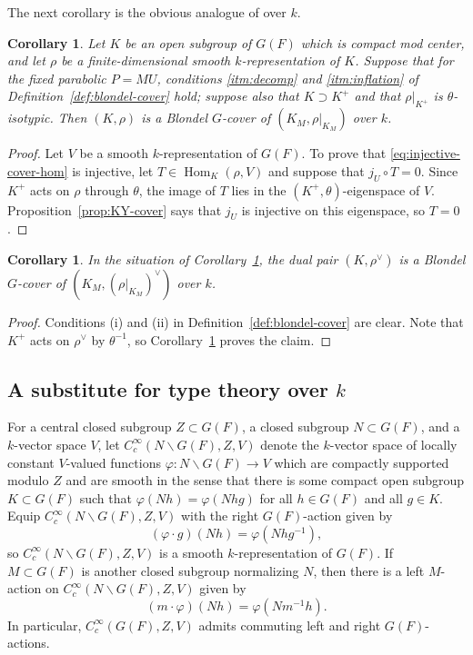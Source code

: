 \documentclass[reqno]{amsart}
\numberwithin{equation}{subsection}
\newcommand{\co}{\colon}
\DeclareMathOperator{\Hom}{Hom}
\newtheorem{cor}[thm]{Corollary}
\theoremstyle{remark}
\numberwithin{equation}{subsection}
\numberwithin{figure}{subsection}
\begin{document}
The next corollary is the obvious analogue of \cite[Corollary 6.4]{KY17} over $k$. 

\begin{cor}\label{cor:KY-64}
Let $K$ be an open subgroup of $G(F)$ which is compact mod center, and let $\rho$ be a finite-dimensional smooth $k$-representation of $K$. Suppose that for the fixed parabolic $P=MU$, conditions \ref{itm:decomp} and \ref{itm:inflation} of Definition~\ref{def:blondel-cover} hold; suppose also that $K\supset K^+$ and that $\rho|_{K^+}$ is $\theta$-isotypic. Then $(K,\rho)$ is a Blondel $G$-cover of $(K_M,\rho|_{K_M})$ over $k$.
\end{cor}

\begin{proof}
Let $V$ be a smooth $k$-representation of $G(F)$. To prove that \eqref{eq:injective-cover-hom} is injective, let $T\in\Hom_K(\rho,V)$ and suppose that $j_U\circ T=0$. Since $K^+$ acts on $\rho$ through $\theta$, the image of $T$ lies in the $(K^+,\theta)$-eigenspace of $V$. Proposition~\ref{prop:KY-cover} says that $j_U$ is injective on this eigenspace, so $T=0$.
\end{proof}


\begin{cor}\label{cor:KY-dual-cover}
In the situation of Corollary~\ref{cor:KY-64}, the dual pair $(K,\rho^\vee)$ is a Blondel $G$-cover of $(K_M,(\rho|_{K_M})^{\vee})$ over $k$.
\end{cor}

\begin{proof}
Conditions (i) and (ii) in Definition~\ref{def:blondel-cover} are clear. Note that $K^+$ acts on $\rho^\vee$ by $\theta^{-1}$, so Corollary~\ref{cor:KY-64} proves the claim.
\end{proof}

\subsection{A substitute for type theory over \texorpdfstring{\(k\)}{k}}

For a central closed subgroup $Z \subset G(F)$, a closed subgroup $N \subset G(F)$, and a $k$-vector space $V$, let $C_c^\infty(N\backslash G(F),Z,V)$ denote the $k$-vector space of locally constant $V$-valued functions $\varphi\co N\backslash G(F) \to V$ which are compactly supported modulo $Z$ and are smooth in the sense that there is some compact open subgroup $K \subset G(F)$ such that $\varphi(Nh) = \varphi(Nhg)$ for all $h \in G(F)$ and all $g \in K$. Equip $C_c^\infty(N\backslash G(F),Z,V)$ with the right $G(F)$-action given by
\[
(\varphi \cdot g)(Nh) = \varphi(Nhg^{-1}),
\]
so $C_c^\infty(N\backslash G(F), Z, V)$ is a smooth $k$-representation of $G(F)$. If $M \subset G(F)$ is another closed subgroup normalizing $N$, then there is a left $M$-action on $C_c^\infty(N\backslash G(F), Z, V)$ given by
\[
(m \cdot \varphi)(Nh) = \varphi(Nm^{-1}h).
\]
In particular, $C_c^\infty(G(F), Z, V)$ admits commuting left and right $G(F)$-actions.
\end{document}
